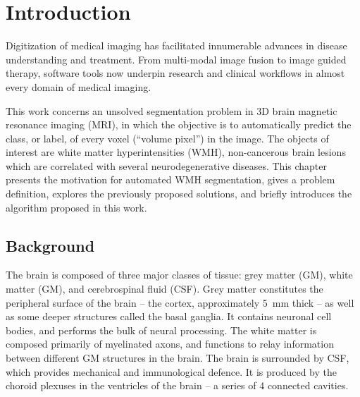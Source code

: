 \chapter{Introduction}\label{ch-intro}
Digitization of medical imaging has facilitated
innumerable advances in disease understanding and treatment.
From multi-modal image fusion to image guided therapy, software tools now underpin
research and clinical workflows in almost every domain of medical imaging.
\par
This work concerns an unsolved segmentation problem in 3D brain magnetic resonance imaging (MRI),
in which the objective is to automatically predict the
class, or label, of every voxel (``volume pixel'') in the image.
The objects of interest are white matter hyperintensities (WMH),
non-cancerous brain lesions which are correlated with several neurodegenerative diseases.
This chapter
presents the motivation for automated WMH segmentation,
gives a problem definition,
explores the previously proposed solutions,
and briefly introduces the algorithm proposed in this work.
\section{Background}
The brain is composed of three major classes of tissue:
grey matter (GM), white matter (GM), and cerebrospinal fluid (CSF).
Grey matter constitutes the peripheral surface of the brain
-- the cortex, approximately \SI{5}{\milli\metre} thick --
as well as some deeper structures called the basal ganglia.
It contains neuronal cell bodies, and performs the bulk of neural processing.
The white matter is composed primarily of myelinated axons,
and functions to relay information between different GM structures in the brain.
The brain is surrounded by CSF, which provides mechanical and immunological defence.
It is produced by the choroid plexuses in the ventricles of the brain
-- a series of 4 connected cavities.
